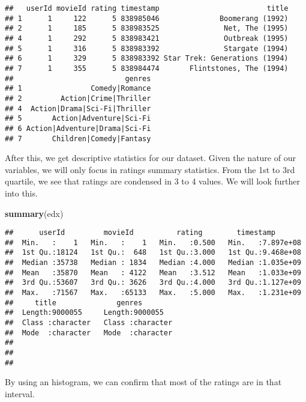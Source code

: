 \documentclass[]{article}
\newenvironment{Shaded}{\begin{snugshade}}{\end{snugshade}}
\newcommand{\KeywordTok}[1]{\textcolor[rgb]{0.13,0.29,0.53}{\textbf{#1}}}
\newcommand{\OperatorTok}[1]{\textcolor[rgb]{0.81,0.36,0.00}{\textbf{#1}}}
\newcommand{\NormalTok}[1]{#1}
\begin{document}
\begin{verbatim}
##   userId movieId rating timestamp                         title
## 1      1     122      5 838985046              Boomerang (1992)
## 2      1     185      5 838983525               Net, The (1995)
## 4      1     292      5 838983421               Outbreak (1995)
## 5      1     316      5 838983392               Stargate (1994)
## 6      1     329      5 838983392 Star Trek: Generations (1994)
## 7      1     355      5 838984474       Flintstones, The (1994)
##                          genres
## 1                Comedy|Romance
## 2         Action|Crime|Thriller
## 4  Action|Drama|Sci-Fi|Thriller
## 5       Action|Adventure|Sci-Fi
## 6 Action|Adventure|Drama|Sci-Fi
## 7       Children|Comedy|Fantasy
\end{verbatim}

After this, we get descriptive statistics for our dataset. Given the
nature of our variables, we will only focus in ratings summary
statistics. From the 1st to 3rd quartile, we see that ratings are
condensed in 3 to 4 values. We will look further into this.

\begin{Shaded}
\begin{Highlighting}[]
\KeywordTok{summary}\NormalTok{(edx)}
\end{Highlighting}
\end{Shaded}

\begin{verbatim}
##      userId         movieId          rating        timestamp        
##  Min.   :    1   Min.   :    1   Min.   :0.500   Min.   :7.897e+08  
##  1st Qu.:18124   1st Qu.:  648   1st Qu.:3.000   1st Qu.:9.468e+08  
##  Median :35738   Median : 1834   Median :4.000   Median :1.035e+09  
##  Mean   :35870   Mean   : 4122   Mean   :3.512   Mean   :1.033e+09  
##  3rd Qu.:53607   3rd Qu.: 3626   3rd Qu.:4.000   3rd Qu.:1.127e+09  
##  Max.   :71567   Max.   :65133   Max.   :5.000   Max.   :1.231e+09  
##     title              genres         
##  Length:9000055     Length:9000055    
##  Class :character   Class :character  
##  Mode  :character   Mode  :character  
##                                       
##                                       
## 
\end{verbatim}

By using an histogram, we can confirm that most of the ratings are in
that interval.

\begin{Shaded}
\end{Shaded}
\end{document}

